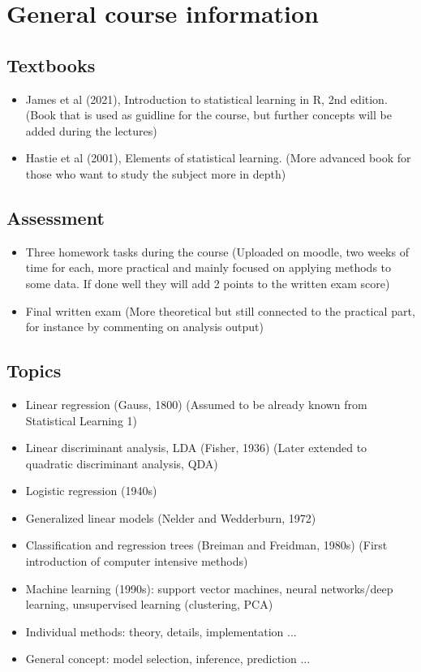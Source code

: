 \chapter{General course information}
  \section{Textbooks}
    \begin{itemize}
      \item James et al (2021), Introduction to statistical learning in R, 2nd edition. (Book that is used as guidline for the course, but further concepts will be added during the lectures)
      \item Hastie et al (2001), Elements of statistical learning. (More advanced book for those who want to study the subject more in depth)
    \end{itemize}

  \section{Assessment}
    \begin{itemize}
      \item Three homework tasks during the course (Uploaded on moodle, two weeks of time for each, more practical and mainly focused on applying methods to some data. If done well they will add 2 points to the written exam score)
      \item Final written exam (More theoretical but still connected to the practical part, for instance by commenting on analysis output)
    \end{itemize}

  \section{Topics}
    \begin{itemize}
      \item Linear regression (Gauss, 1800) (Assumed to be already known from Statistical Learning 1)
      \item Linear discriminant analysis, LDA (Fisher, 1936) (Later extended to quadratic discriminant analysis, QDA)
      \item Logistic regression (1940s)
      \item Generalized linear models (Nelder and Wedderburn, 1972)
      \item Classification and regression trees (Breiman and Freidman, 1980s) (First introduction of computer intensive methods)
      \item Machine learning (1990s): support vector machines, neural networks/deep learning, unsupervised learning (clustering, PCA)
      \item Individual methods: theory, details, implementation ...
      \item General concept: model selection, inference, prediction ...
    \end{itemize}